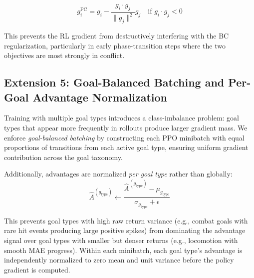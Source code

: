 \documentclass[11pt,a4paper]{article}
\begin{document}
\begin{equation}
g_i^{\text{PC}} = g_i - \frac{g_i \cdot g_j}{\|g_j\|^2} g_j \quad \text{if } g_i \cdot g_j < 0
\label{eq:pcgrad}
\end{equation}

This prevents the RL gradient from destructively interfering with the BC regularization, particularly in early phase-transition steps where the two objectives are most strongly in conflict.

\subsection{Extension 5: Goal-Balanced Batching and Per-Goal Advantage Normalization}

Training with multiple goal types introduces a class-imbalance problem: goal types that appear more frequently in rollouts produce larger gradient mass.
We enforce \emph{goal-balanced batching} by constructing each PPO minibatch with equal proportions of transitions from each active goal type, ensuring uniform gradient contribution across the goal taxonomy.

Additionally, advantages are normalized \emph{per goal type} rather than globally:
\begin{equation}
\hat{A}^{(g_{\text{type}})} \leftarrow \frac{\hat{A}^{(g_{\text{type}})} - \mu_{g_{\text{type}}}}{\sigma_{g_{\text{type}}} + \epsilon}
\label{eq:per-goal-adv}
\end{equation}

This prevents goal types with high raw return variance (e.g., combat goals with rare hit events producing large positive spikes) from dominating the advantage signal over goal types with smaller but denser returns (e.g., locomotion with smooth MAE progress).
Within each minibatch, each goal type's advantage is independently normalized to zero mean and unit variance before the policy gradient is computed.
\end{document}
